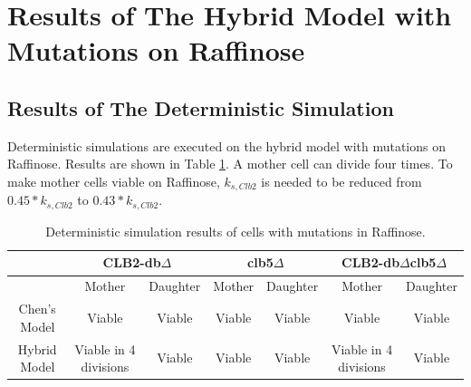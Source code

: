 \documentclass[12pt]{article}
\begin{document}
\newpage
\section{Results of The Hybrid Model with Mutations on Raffinose}
\subsection{Results of The Deterministic Simulation}
Deterministic simulations are executed on the hybrid model with mutations on Raffinose. 
Results are shown in Table \ref{tab:raffinose}.
A mother cell can divide four times. To make mother cells viable on Raffinose, 
$k_{s,Clb2}$ is needed to be reduced from $0.45*k_{s,Clb2}$ to $0.43*k_{s,Clb2}$.
\begin{table}[H]
  \centering
  \caption{Deterministic simulation results of cells with mutations in Raffinose.}
  \vspace{0.2in}
  \begin{tabular}{|c|c|c|c|c|c|c|}
  \hline 
    \multirow{2}{*}{ } & 
    \multicolumn{2}{c|}{CLB2-db$\Delta$} & 
    \multicolumn{2}{c|}{clb5$\Delta$} & 
    \multicolumn{2}{c|}{CLB2-db$\Delta$clb5$\Delta$} \\
  \hline
    & Mother & Daughter & Mother & Daughter & Mother & Daughter \\
  \hline
  \hline
  Chen's Model  & Viable                 &  Viable  & Viable & Viable & Viable  & Viable \\
  Hybrid Model  & Viable in 4 divisions  &  Viable  & Viable & Viable & Viable in 4 divisions & Viable \\
  \hline
  \end{tabular}
  \label{tab:raffinose}
\end{table}
\end{document}
